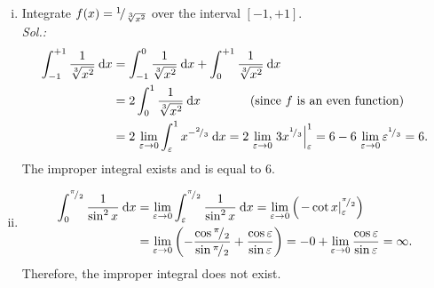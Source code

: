 \begin{example}[Type II]
\label{expl:ii_t2}
\begin{enumerate}[(i)]
	\item Integrate $f(x)={}^{1}\!/_{\sqrt[3]{x^2}}$ over the interval $[-1,+1]$.\\
{\it Sol.:}
\begin{equation*}
\begin{split}
\int_{-1}^{+1} \frac{1}{\sqrt[3]{x^2}} \: \mathrm{d} x 
& = \int_{-1}^{0} \frac{1}{\sqrt[3]{x^2}} \: \mathrm{d} x + \int_{0}^{+1} \frac{1}{\sqrt[3]{x^2}} \: \mathrm{d} x \\
& = 2 \int_{0}^{1} \frac{1}{\sqrt[3]{x^2}} \: \mathrm{d} x 
	\qquad \qquad \text{(since $f$ is an even function)} \\
& = 2\,\lim_{\varepsilon \to 0} \int_{\varepsilon}^{1} x^{-{}^{2}\!/_{3}} \: \mathrm{d} x
= 2\,\lim_{\varepsilon \to 0} \left. 3 x^{{}^{1}\!/_{3}} \right|_\varepsilon^1
= 6 - 6\,\lim_{\varepsilon \to 0} \varepsilon^{{}^{1}\!/_{3}} = 6.
\end{split}
\end{equation*}
The improper integral exists and is equal to $6$.
	\item
\begin{equation*}
\begin{split}
\int_{0}^{{}^{\pi}\!/_{2}} \frac{1}{\sin^2x} \: \mathrm{d} x 
& = \lim_{\varepsilon \to 0} \int_{\varepsilon}^{{}^{\pi}\!/_{2}} \frac{1}{\sin^2x} \: \mathrm{d} x 
= \lim_{\varepsilon \to 0} \left( \left. -\cot x \right|_\varepsilon^{{}^{\pi}\!/_{2}} \right) \\
& = \lim_{\varepsilon \to 0} \left( -\frac{\cos{}^{\pi}\!/_{2}}{\sin{}^{\pi}\!/_{2}} 
	+ \frac{\cos\varepsilon}{\sin\varepsilon} \right)
= - 0 + \lim_{\varepsilon \to 0} \frac{\cos\varepsilon}{\sin\varepsilon} = \infty.
\end{split}
\end{equation*}
Therefore, the improper integral does not exist.
\end{enumerate}
\end{example}


